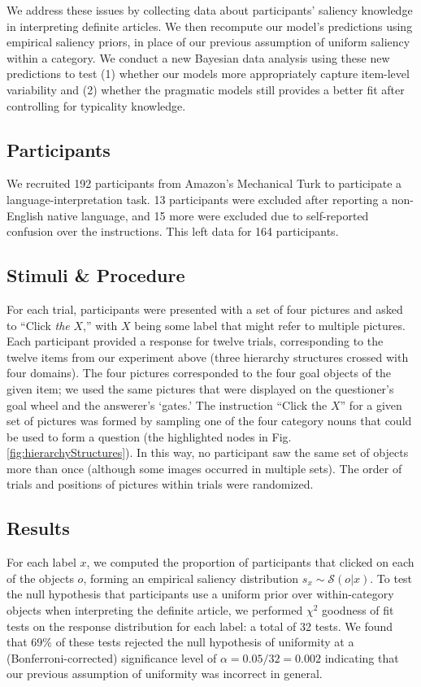 \documentclass[12pt, floatsintext, jou]{apa6}
\begin{document}
We address these issues by collecting data about participants' saliency knowledge in interpreting definite articles. We then recompute our model's predictions using empirical saliency priors, in place of our previous assumption of uniform saliency within a category. We conduct a new Bayesian data analysis using these new predictions to test (1) whether our models more appropriately capture item-level variability and (2) whether the pragmatic models still provides a better fit after controlling for typicality knowledge.

\subsection{Participants} 
We recruited 192 participants from Amazon's Mechanical Turk to participate a language-interpretation task. 13 participants were excluded after reporting a non-English native language, and 15 more were excluded due to self-reported confusion over the instructions. This left data for 164 participants.

\subsection{Stimuli \& Procedure}
For each trial, participants were presented with a set of four pictures and asked to ``Click \emph{the} $X$,'' with $X$ being some label that might refer to multiple pictures. Each participant provided a response for twelve trials, corresponding to the twelve items from our experiment above (three hierarchy structures crossed with four domains). The four pictures corresponded to the four goal objects of the given item; we used the same pictures that were displayed on the questioner's goal wheel and the answerer's `gates.' The instruction ``Click the $X$'' for a given set of pictures was formed by sampling one of the four category nouns that could be used to form a question (the highlighted nodes in Fig. \ref{fig:hierarchyStructures}). In this way, no participant saw the same set of objects more than once (although some images occurred in multiple sets). The order of trials and positions of pictures within trials were randomized.

\subsection{Results}

For each label $x$, we computed the proportion of participants that clicked on each of the objects $o$, forming an empirical saliency distribution $s_x \sim \mathcal{S}(o | x)$. To test the null hypothesis that participants use a uniform prior over within-category objects when interpreting the definite article, we performed $\chi^2$ goodness of fit tests on the response distribution for each label: a total of 32 tests. We found that 69\% of these tests rejected the null hypothesis of uniformity at a (Bonferroni-corrected) significance level of $\alpha = 0.05/32 = 0.002$ indicating that our previous assumption of uniformity was incorrect in general. 
\end{document}
